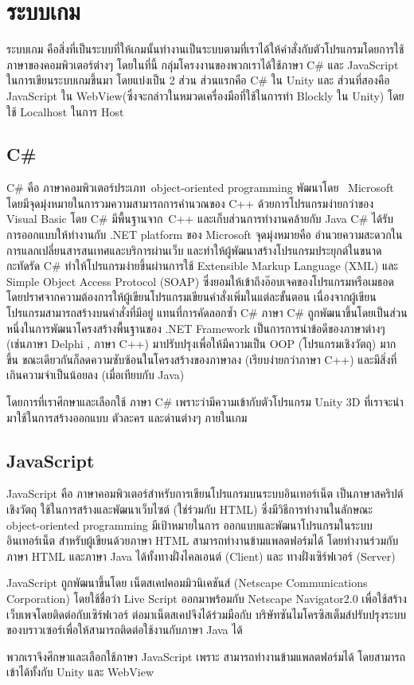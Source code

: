 \section{ระบบเกม}
ระบบเกม คือสิ่งที่เป็นระบบที่ให้เกมนั้นทำงานเป็นระบบตามที่เราได้ให้คำสั่งกับตัวโปรแกรมโดยการใช้ภาษาของคอมพิวเตอร์ต่างๆ 
โดยในที่นี้ กลุ่มโครงงานของพวกเราได้ใช้ภาษา C\#\cite{cs} และ JavaScript\cite{js}
ในการเขียนระบบเกมขึ้นมา โดยแบ่งเป็น 2 ส่วน ส่วนแรกคือ C\# ใน Unity 
และ ส่วนที่สองคือ JavaScript ใน WebView(ซึ่งจะกล่าวในหมวดเครื่องมือที่ใช้ในการทำ Blockly ใน Unity) โดยใช้ Localhost ในการ Host\par

\subsection{C\#}
C\# คือ ภาษาคอมพิวเตอร์ประเภท  object-oriented programming พัฒนาโดย
  Microsoft โดยมีจุดมุ่งหมายในการวมความสามารถการคำนวณของ 
C++ ด้วยการโปรแกรมง่ายกว่าของ Visual Basic โดย C\# มีพื้นฐานจาก 
C++ และเก็บส่วนการทำงานคล้ายกับ Java 
C\# ได้รับการออกแบบให้ทำงานกับ .NET platform ของ Microsoft
จุดมุ่งหมายคือ อำนวยความสะดวกในการแลกเปลี่ยนสารสนเทศและบริการผ่านเว็บ 
และทำให้ผู้พัฒนาสร้างโปรแกรมประยุกต์ในขนาดกะทัดรัด C\# 
ทำให้โปรแกรมง่ายขึ้นผ่านการใช้ Extensible Markup Language (XML) 
และ Simple Object Access Protocol (SOAP) 
ซึ่งยอมให้เข้าถึงอ๊อบเจคของโปรแกรมหรือเมธอด 
โดยปราศจากความต้องการให้ผู้เขียนโปรแกรมเขียนคำสั่งเพิ่มในแต่ละขั้นตอน 
เนื่องจากผู้เขียนโปรแกรมสามารถสร้างบนคำสั่งที่มีอยู่ 
แทนที่การคัดลอกซ้ำ C\#
ภาษา C\# ถูกพัฒนาขึ้นโดยเป็นส่วนหนึ่งในการพัฒนาโครงสร้างพื้นฐานของ
.NET Framework เป็นการการนำข้อดีของภาษาต่างๆ 
(เช่นภาษา Delphi , ภาษา C++) มาปรับปรุงเพื่อให้มีความเป็น OOP 
(โปรแกรมเชิงวัตถุ) มากขึ้น ขณะเดียวกันก็ลดความซับซ้อนในโครงสร้างของภาษาลง (เรียบง่ายกว่าภาษา C++) 
และมีสิ่งที่เกินความจำเป็นน้อยลง (เมื่อเทียบกับ Java)~\cite{cs}\par
โดยการที่เราศึกษาและเลือกใช้ ภาษา C\# เพราะว่ามีความเข้ากับตัวโปรแกรม 
Unity 3D ที่เราจะนำมาใช้ในการสร้างออกแบบ ตัวละคร และด่านต่างๆ ภายในเกม\newline
\subsection{JavaScript}
JavaScript คือ ภาษาคอมพิวเตอร์สำหรับการเขียนโปรแกรมบนระบบอินเทอร์เน็ต 
เป็นภาษาสคริปต์เชิงวัตถุ ใช้ในการสร้างและพัฒนาเว็บไซต์ (ใช่ร่วมกับ HTML) 
ซึ่งมีวิธีการทำงานในลักษณะ object-oriented programming มีเป้าหมายในการ 
ออกแบบและพัฒนาโปรแกรมในระบบอินเทอร์เน็ต สำหรับผู้เขียนด้วยภาษา HTML 
สามารถทำงานข้ามแพลตฟอร์มได้ โดยทำงานร่วมกับ ภาษา HTML และภาษา Java 
ได้ทั้งทางฝั่งไคลเอนต์ (Client) และ ทางฝั่งเซิร์ฟเวอร์ (Server)\par
JavaScript ถูกพัฒนาขึ้นโดย เน็ตสเคปคอมมิวนิเคชันส์ 
(Netscape Communications Corporation) 
โดยใช้ชื่อว่า Live Script ออกมาพร้อมกับ Netscape Navigator2.0 
เพื่อใช้สร้างเว็บเพจโดยติดต่อกับเซิร์ฟเวอร์
ต่อมาเน็ตสเคปจึงได้ร่วมมือกับ บริษัทซันไมโครซิสเต็มส์ปรับปรุงระบบ
ของบราวเซอร์เพื่อให้สามารถติดต่อใช้งานกับภาษา Java ได้~\cite{js}\par
พวกเราจึงศึกษาและเลือกใช้ภาษา JavaScript เพราะ 
สามารถทำงานข้ามแพลตฟอร์มได้ โดยสามารถเข้าได้ทั้งกับ Unity และ WebView

